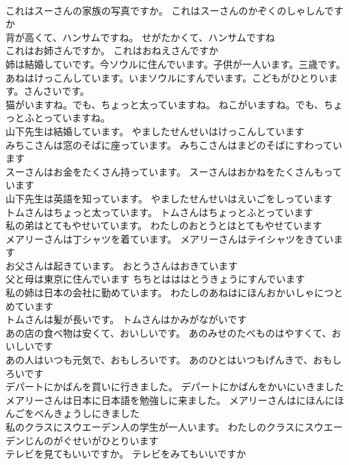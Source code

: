 \documentclass[8pt]{extreport}
\begin{document}
\begin{CJK}{UTF8}{min}
\\	これはスーさんの家族の写真ですか。	これはスーさんのかぞくのしゃしんですか 
\\	背が高くて、ハンサムですね。	せがたかくて、ハンサムですね 
\\	これはお姉さんですか。	これはおねえさんですか 
\\	姉は結婚していです。今ソウルに住んでいます。子供が一人います。三歳です。	あねはけっこんしています。いまソウルにすんでいます。こどもがひとりいます。さんさいです。 
\\	猫がいますね。でも、ちょっと太っていますね。	ねこがいますね。でも、ちょっとふとっていますね。 
\\	山下先生は結婚しています。	やましたせんせいはけっこんしています 
\\	みちこさんは窓のそばに座っています。	みちこさんはまどのそばにすわっています 
\\	スーさんはお金をたくさん持っています。	スーさんはおかねをたくさんもっています 
\\	山下先生は英語を知っています。	やましたせんせいはえいごをしっています 
\\	トムさんはちょっと太っています。	トムさんはちょっとふとっています 
\\	私の弟はとてもやせいています。	わたしのおとうとはとてもやせています 
\\	メアリーさんは丁シャツを着ています。	メアリーさんはテイシャツをきています 
\\	お父さんは起きています。	おとうさんはおきています 
\\	父と母は東京に住んでいます	ちちとはははとうきょうにすんでいます 
\\	私の姉は日本の会社に勤めています。	わたしのあねはにほんおかいしゃにつとめています 
\\	トムさんは髪が長いです。	トムさんはかみがながいです 
\\	あの店の食べ物は安くて、おいしいです。	あのみせのたべものはやすくて、おいしいです 
\\	あの人はいつも元気で、おもしろいです。	あのひとはいつもげんきで、おもしろいです 
\\	デパートにかばんを買いに行きました。	デパートにかばんをかいにいきました 
\\	メアリーさんは日本に日本語を勉強しに来ました。	メアリーさんはにほんにほんごをべんきょうしにきました 
\\	私のクラスにスウエーデン人の学生が一人います。	わたしのクラスにスウエーデンじんのがぐせいがひとりいます 
\\	テレビを見てもいいですか。	テレビをみてもいいですか 

\end{CJK}
\end{document}
